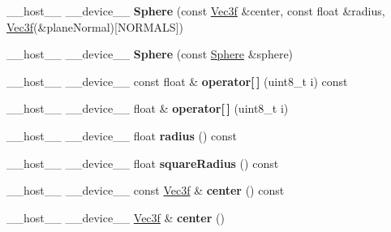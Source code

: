 \begin{DoxyCompactItemize}
\item 
\+\_\+\+\_\+host\+\_\+\+\_\+ \+\_\+\+\_\+device\+\_\+\+\_\+ {\bfseries Sphere} (const \hyperlink{class_vec3}{Vec3f} \&center, const float \&radius, \hyperlink{class_vec3}{Vec3f}(\&plane\+Normal)\mbox{[}N\+O\+R\+M\+A\+LS\mbox{]})\hypertarget{class_sphere_afb7e10efe86404fc6df407381cc8fdcd}{}\label{class_sphere_afb7e10efe86404fc6df407381cc8fdcd}

\item 
\+\_\+\+\_\+host\+\_\+\+\_\+ \+\_\+\+\_\+device\+\_\+\+\_\+ {\bfseries Sphere} (const \hyperlink{class_sphere}{Sphere} \&sphere)\hypertarget{class_sphere_af805e2d486b9a5be47852afc1636e509}{}\label{class_sphere_af805e2d486b9a5be47852afc1636e509}

\item 
\+\_\+\+\_\+host\+\_\+\+\_\+ \+\_\+\+\_\+device\+\_\+\+\_\+ const float \& {\bfseries operator\mbox{[}$\,$\mbox{]}} (uint8\+\_\+t i) const\hypertarget{class_sphere_a88b42eee079d355abdb8a017d75194cc}{}\label{class_sphere_a88b42eee079d355abdb8a017d75194cc}

\item 
\+\_\+\+\_\+host\+\_\+\+\_\+ \+\_\+\+\_\+device\+\_\+\+\_\+ float \& {\bfseries operator\mbox{[}$\,$\mbox{]}} (uint8\+\_\+t i)\hypertarget{class_sphere_a600040147f19a03713b9dcdb508cbff0}{}\label{class_sphere_a600040147f19a03713b9dcdb508cbff0}

\item 
\+\_\+\+\_\+host\+\_\+\+\_\+ \+\_\+\+\_\+device\+\_\+\+\_\+ float {\bfseries radius} () const\hypertarget{class_sphere_a90c900da43ea7b40e7c7e0fd66fbf8f2}{}\label{class_sphere_a90c900da43ea7b40e7c7e0fd66fbf8f2}

\item 
\+\_\+\+\_\+host\+\_\+\+\_\+ \+\_\+\+\_\+device\+\_\+\+\_\+ float {\bfseries square\+Radius} () const\hypertarget{class_sphere_a00919fefbe3c39b8b749296fbfd3d856}{}\label{class_sphere_a00919fefbe3c39b8b749296fbfd3d856}

\item 
\+\_\+\+\_\+host\+\_\+\+\_\+ \+\_\+\+\_\+device\+\_\+\+\_\+ const \hyperlink{class_vec3}{Vec3f} \& {\bfseries center} () const\hypertarget{class_sphere_af54a2aee3eb6e2b38ceb831781a83a50}{}\label{class_sphere_af54a2aee3eb6e2b38ceb831781a83a50}

\item 
\+\_\+\+\_\+host\+\_\+\+\_\+ \+\_\+\+\_\+device\+\_\+\+\_\+ \hyperlink{class_vec3}{Vec3f} \& {\bfseries center} ()\hypertarget{class_sphere_ac75988494d7347a95a0831337f887f52}{}\label{class_sphere_ac75988494d7347a95a0831337f887f52}


\end{DoxyCompactItemize}
